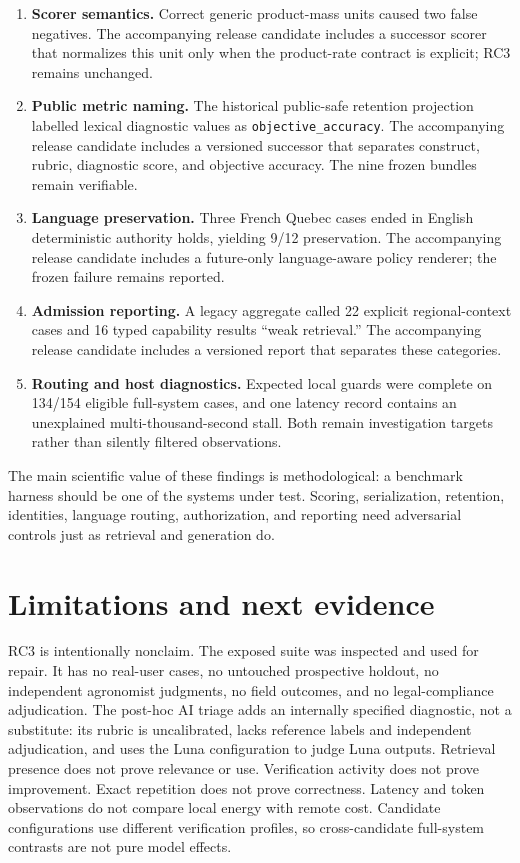 \documentclass[9pt,twocolumn]{article}
\begin{document}
\begin{enumerate}
  \item \textbf{Scorer semantics.} Correct generic product-mass units caused two false negatives. The accompanying release candidate includes a successor scorer that normalizes this unit only when the product-rate contract is explicit; RC3 remains unchanged.
  \item \textbf{Public metric naming.} The historical public-safe retention projection labelled lexical diagnostic values as \texttt{objective\_accuracy}. The accompanying release candidate includes a versioned successor that separates construct, rubric, diagnostic score, and objective accuracy. The nine frozen bundles remain verifiable.
  \item \textbf{Language preservation.} Three French Quebec cases ended in English deterministic authority holds, yielding 9/12 preservation. The accompanying release candidate includes a future-only language-aware policy renderer; the frozen failure remains reported.
  \item \textbf{Admission reporting.} A legacy aggregate called 22 explicit regional-context cases and 16 typed capability results ``weak retrieval.'' The accompanying release candidate includes a versioned report that separates these categories.
  \item \textbf{Routing and host diagnostics.} Expected local guards were complete on 134/154 eligible full-system cases, and one latency record contains an unexplained multi-thousand-second stall. Both remain investigation targets rather than silently filtered observations.
\end{enumerate}

The main scientific value of these findings is methodological: a benchmark harness should be one of the systems under test. Scoring, serialization, retention, identities, language routing, authorization, and reporting need adversarial controls just as retrieval and generation do.

\section{Limitations and next evidence}

RC3 is intentionally nonclaim. The exposed suite was inspected and used for repair. It has no real-user cases, no untouched prospective holdout, no independent agronomist judgments, no field outcomes, and no legal-compliance adjudication. The post-hoc AI triage adds an internally specified diagnostic, not a substitute: its rubric is uncalibrated, lacks reference labels and independent adjudication, and uses the Luna configuration to judge Luna outputs. Retrieval presence does not prove relevance or use. Verification activity does not prove improvement. Exact repetition does not prove correctness. Latency and token observations do not compare local energy with remote cost. Candidate configurations use different verification profiles, so cross-candidate full-system contrasts are not pure model effects.
\end{document}
